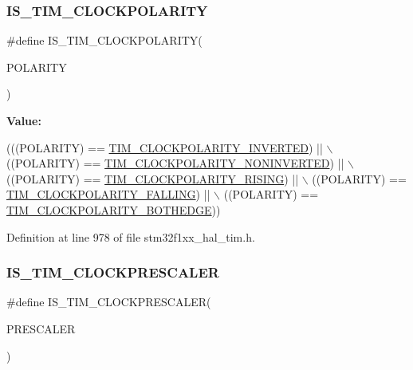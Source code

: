 \subsubsection{\texorpdfstring{I\+S\+\_\+\+T\+I\+M\+\_\+\+C\+L\+O\+C\+K\+P\+O\+L\+A\+R\+I\+TY}{IS\_TIM\_CLOCKPOLARITY}}
{\footnotesize\ttfamily \#define I\+S\+\_\+\+T\+I\+M\+\_\+\+C\+L\+O\+C\+K\+P\+O\+L\+A\+R\+I\+TY(\begin{DoxyParamCaption}\item[{}]{P\+O\+L\+A\+R\+I\+TY }\end{DoxyParamCaption})}

{\bfseries Value\+:}
\begin{DoxyCode}
(((POLARITY) == \hyperlink{group___t_i_m___clock___polarity_gae4eb585c466c2b5709ae3795204e7d3f}{TIM\_CLOCKPOLARITY\_INVERTED})    || \(\backslash\)
                                        ((POLARITY) == 
      \hyperlink{group___t_i_m___clock___polarity_gaca342866be2f9364274584688c733b60}{TIM\_CLOCKPOLARITY\_NONINVERTED}) || \(\backslash\)
                                        ((POLARITY) == \hyperlink{group___t_i_m___clock___polarity_ga13cc7002cfa5ee42607e1a3d85f77b10}{TIM\_CLOCKPOLARITY\_RISING})   
         || \(\backslash\)
                                        ((POLARITY) == \hyperlink{group___t_i_m___clock___polarity_ga9c17ca08b6179792f5ced4e607808c0a}{TIM\_CLOCKPOLARITY\_FALLING}) 
          || \(\backslash\)
                                        ((POLARITY) == 
      \hyperlink{group___t_i_m___clock___polarity_ga89bf9a7962d09fb58ceae4d1e28e1c89}{TIM\_CLOCKPOLARITY\_BOTHEDGE}))
\end{DoxyCode}


Definition at line 978 of file stm32f1xx\+\_\+hal\+\_\+tim.\+h.

\mbox{\label{group___t_i_m___private___macros_gadf2164595c18d16cd5e34c81cd732760}} 
\subsubsection{\texorpdfstring{I\+S\+\_\+\+T\+I\+M\+\_\+\+C\+L\+O\+C\+K\+P\+R\+E\+S\+C\+A\+L\+ER}{IS\_TIM\_CLOCKPRESCALER}}
{\footnotesize\ttfamily \#define I\+S\+\_\+\+T\+I\+M\+\_\+\+C\+L\+O\+C\+K\+P\+R\+E\+S\+C\+A\+L\+ER(\begin{DoxyParamCaption}\item[{}]{P\+R\+E\+S\+C\+A\+L\+ER }\end{DoxyParamCaption})}

